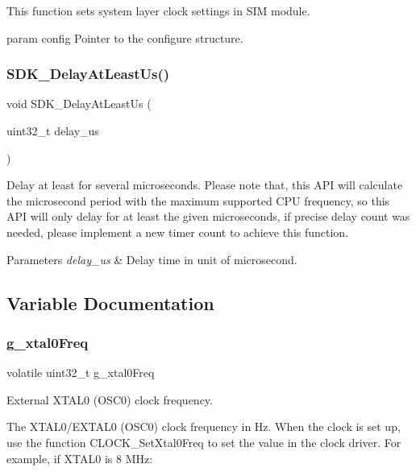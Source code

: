 This function sets system layer clock settings in S\+IM module.

param config Pointer to the configure structure. \mbox{\label{group__clock_gaf9804be766685e8ffd3221461bf00d1b}} 
\subsubsection{\texorpdfstring{SDK\_DelayAtLeastUs()}{SDK\_DelayAtLeastUs()}}
{\footnotesize\ttfamily void S\+D\+K\+\_\+\+Delay\+At\+Least\+Us (\begin{DoxyParamCaption}\item[{uint32\+\_\+t}]{delay\+\_\+us }\end{DoxyParamCaption})}



Delay at least for several microseconds. Please note that, this A\+PI will calculate the microsecond period with the maximum supported C\+PU frequency, so this A\+PI will only delay for at least the given microseconds, if precise delay count was needed, please implement a new timer count to achieve this function. 


\begin{DoxyParams}{Parameters}
{\em delay\+\_\+us} & Delay time in unit of microsecond. \\
\hline
\end{DoxyParams}


\subsection{Variable Documentation}
\mbox{\label{group__clock_ga70a4a6ffb6c5a7a271aad89fe482bafc}} 
\subsubsection{\texorpdfstring{g\_xtal0Freq}{g\_xtal0Freq}}
{\footnotesize\ttfamily volatile uint32\+\_\+t g\+\_\+xtal0\+Freq}



External X\+T\+A\+L0 (O\+S\+C0) clock frequency. 

The X\+T\+A\+L0/\+E\+X\+T\+A\+L0 (O\+S\+C0) clock frequency in Hz. When the clock is set up, use the function C\+L\+O\+C\+K\+\_\+\+Set\+Xtal0\+Freq to set the value in the clock driver. For example, if X\+T\+A\+L0 is 8 M\+Hz\+: 
\begin{DoxyCode}{0}
\end{DoxyCode}


